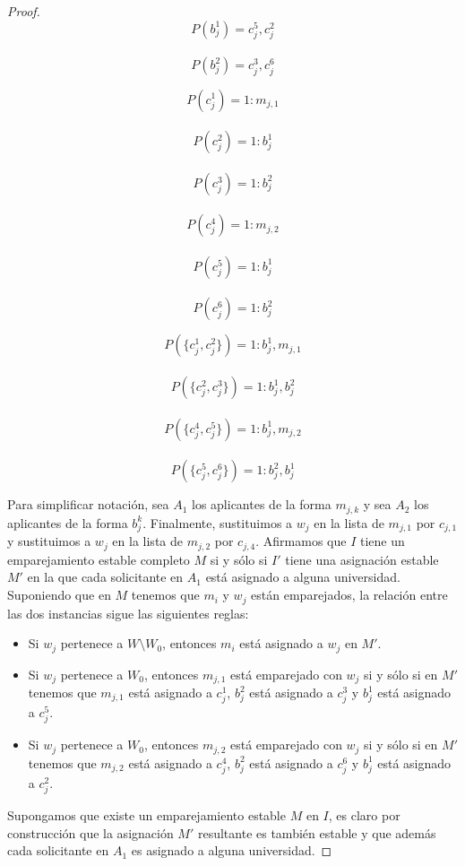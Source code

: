 \begin{proof}
\begin{minipage}{.3\linewidth}
$$P(b_j^1)=c_j^5,c_j^2$$ \\
$$P(b_j^2)=c_j^3,c_j^6$$ 
\end{minipage}%
\begin{minipage}{.3\linewidth}
$$P(c_j^1)=1:m_{j,1}$$ \\
$$P(c_j^2)=1:b_j^1$$ \\
$$P(c_j^3)=1: b_j^2$$ \\
$$P(c_j^4)=1: m_{j,2}$$ \\
$$P(c_j^5)=1: b_j^1$$ \\
$$P(c_j^6)=1: b_j^2$$ 
\end{minipage}
\begin{minipage}{.4\linewidth}
$$P(\{c_j^1,c_j^2\})= 1:b_j^1,m_{j,1}$$ \\
$$P(\{c_j^2,c_j^3\})=1:b_j^1,b_j^2$$ \\
$$P(\{c_j^4,c_j^5\})= 1:b_j^1,m_{j,2}$$ \\
$$P(\{c_j^5,c_j^6\})=1:b_j^2,b_j^1$$
\end{minipage}
Para simplificar notación, sea $A_1$ los aplicantes de la forma $m_{j,k}$ y sea $A_2$ los aplicantes de la forma $b_j^k$. Finalmente, sustituimos a $w_j$ en la lista de $m_{j,1}$ por $c_{j,1}$ y sustituimos a $w_j$ en la lista de $m_{j,2}$ por $c_{j,4}$. Afirmamos que $I$ tiene un emparejamiento estable completo $M$ si y sólo si $I'$ tiene una asignación estable $M'$ en la que cada solicitante en $A_1$ está asignado a alguna universidad. Suponiendo que en $M$ tenemos que $m_i$ y $w_j$ están emparejados, la relación entre las dos instancias sigue las siguientes reglas:
\begin{itemize}
\item Si $w_j$ pertenece a $W \setminus W_0$, entonces $m_i$ está asignado a $w_j$ en $M'$.
\item Si $w_j$ pertenece a $W_0$, entonces $m_{j,1}$ está emparejado con $w_j$ si y sólo si en $M'$ tenemos que $m_{j,1}$ está asignado a $c_j^1$, $b_j^2$ está asignado a $c_j^3$ y $b_j^1$ está asignado a $c_j^5$.
\item Si $w_j$ pertenece a $W_0$, entonces $m_{j,2}$ está emparejado con $w_j$ si y sólo si en $M'$ tenemos que $m_{j,2}$ está asignado a $c_j^4$, $b_j^2$ está asignado a $c_j^6$ y $b_j^1$ está asignado a $c_j^2$.
\end{itemize}

Supongamos que existe un emparejamiento estable $M$ en $I$, es claro por construcción que la asignación $M'$ resultante es también estable y que además cada solicitante en $A_1$ es asignado a alguna universidad. 


\end{proof}
